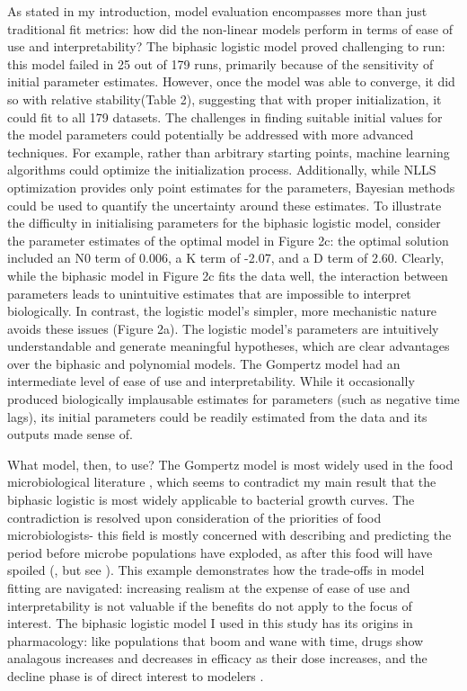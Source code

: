 \documentclass{article}
\begin{document}
As stated in my introduction, model evaluation encompasses more than just traditional fit metrics: how did the non-linear models perform in terms of ease of use and interpretability? The biphasic logistic model proved challenging to run: this model failed in 25 out of 179 runs, primarily because of the sensitivity of initial parameter estimates. However, once the model was able to converge, it did so with relative stability(Table 2), suggesting that with proper initialization, it could fit to all 179 datasets. The challenges in finding suitable initial values for the model parameters could potentially be addressed with more advanced techniques. For example, rather than arbitrary starting points, machine learning algorithms could optimize the initialization process. Additionally, while NLLS optimization provides only point estimates for the parameters, Bayesian methods could be used to quantify the uncertainty around these estimates. To illustrate the difficulty in initialising parameters for the biphasic logistic model, consider the parameter estimates of the optimal model in Figure 2c: the optimal solution included an N0 term of 0.006, a K term of -2.07, and a D term of 2.60. Clearly, while the biphasic model in Figure 2c fits the data well, the interaction between parameters leads to unintuitive estimates that are impossible to interpret biologically. In contrast, the logistic model's simpler, more mechanistic nature avoids these issues (Figure 2a). The logistic model's parameters are intuitively understandable and generate meaningful hypotheses, which are clear advantages over the biphasic and polynomial models. The Gompertz model had an intermediate level of ease of use and interpretability. While it occasionally produced biologically implausable estimates for parameters (such as negative time lags), its initial parameters could be readily estimated from the data and its outputs made sense of.

What model, then, to use? The Gompertz model is most widely used in the food microbiological literature \cite{baranyi1994}, which seems to contradict my main result that the biphasic logistic is most widely applicable to bacterial growth curves. The contradiction is resolved upon consideration of the priorities of food microbiologists- this field is mostly concerned with describing and predicting the period before microbe populations have exploded, as after this food will have spoiled (\cite{micha2011}, but see \cite{horowitz2010}). This example demonstrates how the trade-offs in model fitting are navigated: increasing realism at the expense of ease of use and interpretability is not valuable if the benefits do not apply to the focus of interest. The biphasic logistic model I used in this study has its origins in pharmacology: like populations that boom and wane with time, drugs show analagous increases and decreases in efficacy as their dose increases, and the decline phase is of direct interest to modelers \cite{beckon2008}.
\end{document}
